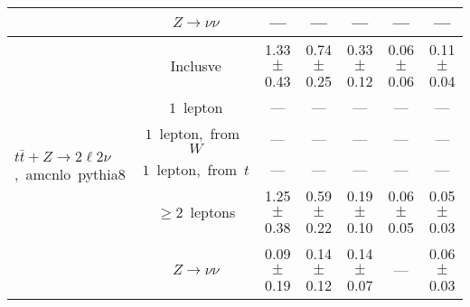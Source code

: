 \documentclass{article}
\begin{document}
\begin{longtable}{|l|c|c|c|c|c|c|}
 & $Z\rightarrow\nu\nu$  & ---  & ---  & ---  & ---  & --- \\* 
\hline 
\multirow{6}{*}{$t\bar{t}+Z{\rightarrow}2{\ell}2{\nu}$,~amcnlo~pythia8} & Inclusve  & 1.33 $\pm$ 0.43  & 0.74 $\pm$ 0.25  & 0.33 $\pm$ 0.12  & 0.06 $\pm$ 0.06  & 0.11 $\pm$ 0.04 \\* 
 & $1$~lepton  & ---  & ---  & ---  & ---  & --- \\* 
 & $1$~lepton,~from~$W$  & ---  & ---  & ---  & ---  & --- \\* 
 & $1$~lepton,~from~$t$  & ---  & ---  & ---  & ---  & --- \\* 
 & $\ge2$~leptons  & 1.25 $\pm$ 0.38  & 0.59 $\pm$ 0.22  & 0.19 $\pm$ 0.10  & 0.06 $\pm$ 0.05  & 0.05 $\pm$ 0.03 \\* 
 & $Z\rightarrow\nu\nu$  & 0.09 $\pm$ 0.19  & 0.14 $\pm$ 0.12  & 0.14 $\pm$ 0.07  & ---  & 0.06 $\pm$ 0.03 \\* 
\hline 
\end{longtable} 

 
 
 
 
\pagebreak 

 
 
 
 
\end{document}
